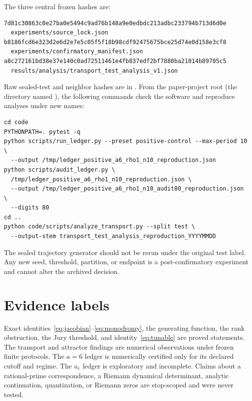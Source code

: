 \documentclass[11pt]{article}
\newcommand{\uc}{u_{\mathrm c}}
\begin{document}
The three central frozen hashes are:
\begin{verbatim}
7d81c30863c0e27ba0e5494c9ad76b148a9e0edbdc213adbc233794b713d6d0e
  experiments/source_lock.json
b8186fcd6e323d2e6d2e7e5c05f5f18b98cdf92475675bce25d74e0d158e3cf8
  experiments/confirmatory_manifest.json
a8c272161bd38e37e140c0ad72511461e4fb837edf2bf7880ba21014b89705c5
  results/analysis/transport_test_analysis_v1.json
\end{verbatim}
Raw sealed-test and neighbor hashes are in
. From the paper-project root (the
directory named ), the
following commands check the software and reproduce analyses under new names:
\begin{verbatim}
cd code
PYTHONPATH=. pytest -q
python scripts/run_ledger.py --preset positive-control --max-period 10 \
  --output /tmp/ledger_positive_a6_rho1_n10_reproduction.json
python scripts/audit_ledger.py \
  /tmp/ledger_positive_a6_rho1_n10_reproduction.json \
  --output /tmp/ledger_positive_a6_rho1_n10_audit80_reproduction.json \
  --digits 80
cd ..
python code/scripts/analyze_transport.py --split test \
  --output-stem transport_test_analysis_reproduction_YYYYMMDD
\end{verbatim}
The sealed trajectory generator should not be rerun under the original test
label. Any new seed, threshold, partition, or endpoint is a
post-confirmatory experiment and cannot alter the archived decision.

\section{Evidence labels}

Exact identities~\eqref{eq:jacobian}--\eqref{eq:monodromy}, the generating
function, the rank obstruction, the Jury threshold, and
identity~\eqref{eq:tunable} are proved statements. The transport and
attractor findings are numerical observations under frozen finite protocols.
The \(a=6\) ledger is numerically certified only for its declared cutoff and
regime. The \(\uc\) ledger is exploratory and incomplete. Claims about a
rational-prime correspondence, a Riemann dynamical determinant, analytic
continuation, quantization, or Riemann zeros are stop-scoped and were never
tested.



\end{document}
